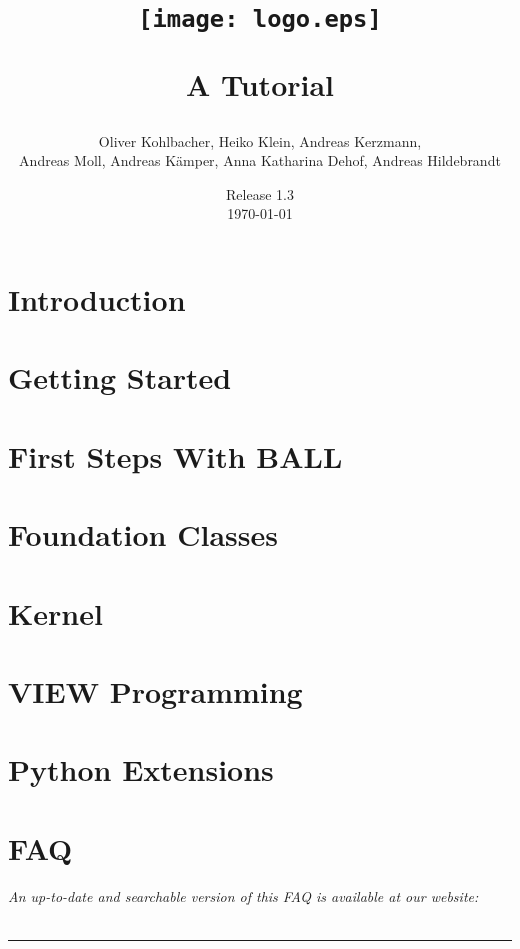 \documentclass[12pt,twoside]{report}
\author{
  Oliver Kohlbacher, Heiko Klein, Andreas Kerzmann, \\
  Andreas Moll, Andreas K\"{a}mper, Anna Katharina Dehof, Andreas Hildebrandt
}
\title{
  \begin{center}
    \texttt{[image: logo.eps]}
  \end{center}
  \vspace{1cm}
  \Large A Tutorial
}
\date{
  Release 1.3\\
  \today
}
\begin{document}
\setlength{\headheight}{14.5pt}
\setcounter{page}{1}
\maketitle
\cleardoublepage

\tableofcontents
\clearpage

\setcounter{page}{1}


\chapter{Introduction}
\label{chapter:introduction}



\chapter{Getting Started}
\label{chapter:getting-started}




\chapter{First Steps With BALL}
\label{chapter:first-steps}




\chapter{Foundation Classes}
\label{chapter:foundation-classes}




\chapter{Kernel}
\label{chapter:kernel}


\chapter{VIEW Programming}
\label{chapter:view-programming}


\chapter{Python Extensions}
\label{chapter:python}


\chapter{FAQ}
\label{chapter:faq}
\newpage
\noindent
{\it An up-to-date and searchable version of this FAQ is available at our 
website:\\
}\\
\hspace{1mm}
\rule{\textwidth}{0.1pt}
\hspace{3mm}

\end{document}

